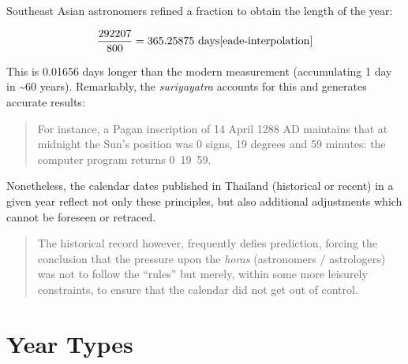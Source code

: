 \documentclass[11pt,oneside]{memoir-article}
\begin{document}
Southeast Asian astronomers refined a fraction to obtain the length of
the year:

\begin{equation}
\frac{292207}{800} = 365.25875\ \text{days}\cite{eade-interpolation}
\end{equation}

This is 0.01656 days longer than the modern measurement (accumulating
1 day in \textasciitilde{}60 years). Remarkably, the \emph{suriyayatra} accounts for this
and generates accurate results:

\begin{quote}
For instance, a Pagan inscription of 14 April 1288 AD maintains that
at midnight the Sun's position was 0 signs, 19 degrees and 59 minutes:
the computer program returns
0~19~59.\cite{eade-calendrical}
\end{quote}

Nonetheless, the calendar dates published in Thailand (historical or
recent) in a given year reflect not only these principles, but also
additional adjustments which cannot be foreseen or retraced.

\begin{quote}
The historical record however, frequently defies prediction, forcing
the conclusion that the pressure upon the \emph{horas} (astronomers /
astrologers) was not to follow the ``rules'' but merely, within some
more leisurely constraints, to ensure that the calendar did not get
out of control.\cite{eade-calendrical}
\end{quote}

\clearpage

\section{Year Types}
\label{sec-3-1}
\end{document}
